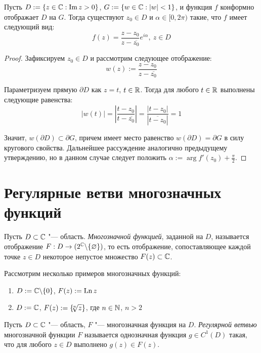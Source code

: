 \begin{proposition}
	Пусть $D := \{z \in \mathbb{C}: \operatorname{Im}{z} > 0\}$, $G := \{w \in \mathbb{C}: |w| < 1\}$, и функция $f$ конформно отображает $D$ на $G$. Тогда существуют $z_0 \in D$ и $\alpha \in [0, 2\pi)$ такие, что $f$ имеет следующий вид:
	\[f(z) = \frac{z - z_0}{z - \overline{z_0}}e^{i\alpha},~z \in D\]
\end{proposition}

\begin{proof}
	Зафиксируем $z_0 \in D$ и рассмотрим следующее отображение:
	\[w(z) := \frac{z - z_0}{z - \overline{z_0}}\]
	
	Параметризуем прямую $\partial D$ как $z = t$, $t \in \mathbb{R}$. Тогда для любого $t \in \mathbb{R}$ выполнены следующие равенства:
	\[\left|w\left(t\right)\right| = \left|\frac{t - z_0}{t - \overline{z_0}}\right| = \frac{|t - z_0|}{\left|\overline{t - z_0}\right|} =  1\]
	
	Значит, $w(\partial D) \subset \partial G$, причем имеет место равенство  $w(\partial D) = \partial G$ в силу кругового свойства. Дальнейшее рассуждение аналогично предыдущему утверждению, но в данном случае следует положить $\alpha := \arg{f'(z_0)} + \frac\pi 2$.
\end{proof}

\section{Регулярные ветви многозначных функций}

\begin{definition}
	Пусть $D \subset \mathbb{C}$ "--- область. \textit{Многозначной функцией}, заданной на $D$, называется отображение $F : D \to (2^{\mathbb{C}} \backslash \{\varnothing\})$, то есть отображение, сопоставляющее каждой точке $z \in D$ некоторое непустое множество $F(z) \subset \mathbb{C}$.
\end{definition}

\begin{example}
	Рассмотрим несколько примеров многозначных функций:
	\begin{enumerate}
		\item $D := \mathbb{C} \backslash \{0\}$, $F(z) := \operatorname{Ln}{z}$
		\item $D := \mathbb{C}$, $F(z) := \left\{\!\!\sqrt[n]{z}\right\}$, где $n \in \mathbb{N}$, $n > 2$
	\end{enumerate}
\end{example}

\begin{definition}
	Пусть $D \subset \mathbb{C}$ "--- область, $F$ "--- многозначная функция на $D$. \textit{Регулярной ветвью} многозначной функции $F$ называется однозначная функция $g \in C^1(D)$ такая, что для любого $z \in D$ выполнено $g(z) \in F(z)$.
\end{definition}


